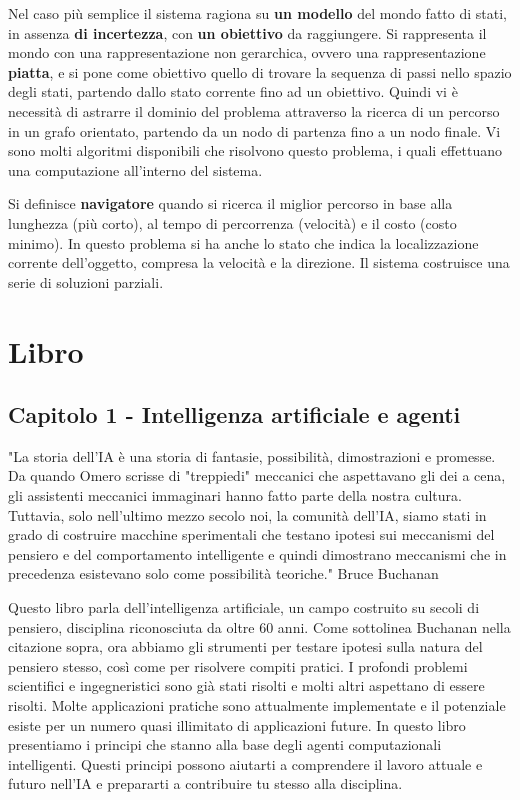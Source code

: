 \documentclass[a4paper]{extarticle}
\begin{document}
Nel caso più semplice il sistema ragiona su \textbf{un modello} del mondo fatto di stati, in assenza \textbf{di incertezza}, con \textbf{un obiettivo} da raggiungere. Si rappresenta il mondo con una rappresentazione non gerarchica, ovvero una rappresentazione \textbf{piatta}, e si pone come obiettivo quello di trovare la sequenza di passi nello spazio degli stati, partendo dallo stato corrente fino ad un obiettivo. Quindi vi è necessità di astrarre il dominio del problema attraverso la ricerca di un percorso in un grafo orientato, partendo da un nodo di partenza fino a un nodo finale. Vi sono molti algoritmi disponibili che risolvono questo problema, i quali effettuano una computazione all'interno del sistema.

Si definisce \textbf{navigatore} quando si ricerca il miglior percorso in base alla lunghezza (più corto), al tempo di percorrenza (velocità) e il costo (costo minimo). In questo problema si ha anche lo stato che indica la localizzazione corrente dell'oggetto, compresa la velocità e la direzione. Il sistema costruisce una serie di soluzioni parziali.
\newpage
\section{Libro}

\subsection{Capitolo 1 - Intelligenza artificiale e agenti}

\begin{center}
"La storia dell'IA è una storia di fantasie, possibilità, dimostrazioni e promesse. Da quando Omero scrisse di "treppiedi" meccanici che aspettavano gli dei a cena, gli assistenti meccanici immaginari hanno fatto parte della nostra cultura. Tuttavia, solo nell'ultimo mezzo secolo noi, la comunità dell'IA, siamo stati in grado di costruire macchine sperimentali che testano ipotesi sui meccanismi del pensiero e del comportamento intelligente e quindi dimostrano meccanismi che in precedenza esistevano solo come possibilità teoriche."
Bruce Buchanan
\end{center}

Questo libro parla dell'intelligenza artificiale, un campo costruito su secoli di pensiero, disciplina riconosciuta da oltre 60 anni. Come sottolinea Buchanan nella citazione sopra, ora abbiamo gli strumenti per testare ipotesi sulla natura del pensiero stesso, così come per risolvere compiti pratici. I profondi problemi scientifici e ingegneristici sono già stati risolti e molti altri aspettano di essere risolti. Molte applicazioni pratiche sono attualmente implementate e il potenziale esiste per un numero quasi illimitato di applicazioni future. In questo libro presentiamo i principi che stanno alla base degli agenti computazionali intelligenti. Questi principi possono aiutarti a comprendere il lavoro attuale e futuro nell'IA e prepararti a contribuire tu stesso alla disciplina.
\end{document}
